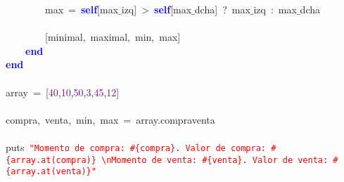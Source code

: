 \mbox{}\ \ \ \ \ \ \ \ max\ \textcolor{BrickRed}{=}\ \textbf{\textcolor{Blue}{self}}\textcolor{BrickRed}{[}max$\_$izq\textcolor{BrickRed}{]}\ \textcolor{BrickRed}{\textgreater{}}\ \textbf{\textcolor{Blue}{self}}\textcolor{BrickRed}{[}max$\_$dcha\textcolor{BrickRed}{]}\ \textcolor{BrickRed}{?}\ max$\_$izq\ \textcolor{BrickRed}{:}\ max$\_$dcha \\
\mbox{} \\
\mbox{}\ \ \ \ \ \ \ \ \textcolor{BrickRed}{[}minimal\textcolor{BrickRed}{,}\ maximal\textcolor{BrickRed}{,}\ min\textcolor{BrickRed}{,}\ max\textcolor{BrickRed}{]}\  \\
\mbox{}\ \ \ \ \textbf{\textcolor{Blue}{end}}\  \\
\mbox{}\textbf{\textcolor{Blue}{end}} \\
\mbox{} \\
\mbox{}array\ \textcolor{BrickRed}{=}\ \textcolor{BrickRed}{[}\textcolor{Purple}{40}\textcolor{BrickRed}{,}\textcolor{Purple}{10}\textcolor{BrickRed}{,}\textcolor{Purple}{50}\textcolor{BrickRed}{,}\textcolor{Purple}{3}\textcolor{BrickRed}{,}\textcolor{Purple}{45}\textcolor{BrickRed}{,}\textcolor{Purple}{12}\textcolor{BrickRed}{]} \\
\mbox{} \\
\mbox{}compra\textcolor{BrickRed}{,}\ venta\textcolor{BrickRed}{,}\ min\textcolor{BrickRed}{,}\ max\ \textcolor{BrickRed}{=}\ array\textcolor{BrickRed}{.}compraventa \\
\mbox{} \\
\mbox{}puts\ \texttt{\textcolor{Red}{"{}Momento\ de\ compra:\ \#\{compra\}.\ Valor\ de\ compra:\ \#\{array.at(compra)\}\ \textbackslash{}nMomento\ de\ venta:\ \#\{venta\}.\ Valor\ de\ venta:\ \#\{array.at(venta)\}"{}}} \\
\mbox{} \\
\mbox{} \\
\mbox{}
